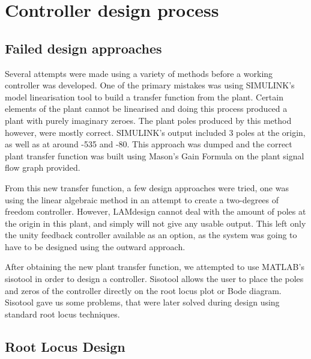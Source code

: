 \section{Controller design process}

\subsection{Failed design approaches}

Several attempts were made using a variety of methods before a working controller was developed. One of the primary mistakes was using SIMULINK's model linearisation tool to build a transfer function from the plant. Certain elements of the plant cannot be linearised and doing this process produced a plant with purely imaginary zeroes. The plant poles produced by this method however, were mostly correct. SIMULINK's output included 3 poles at the origin, as well as at around -535 and -80. This approach was dumped and the correct plant transfer function was built using Mason's Gain Formula on the plant signal flow graph provided.

From this new transfer function, a few design approaches were tried, one was using the linear algebraic method in an attempt to create a two-degrees of freedom controller. However, LAMdesign cannot deal with the amount of poles at the origin in this plant, and simply will not give any usable output. This left only the unity feedback controller available as an option, as the system was going to have to be designed using the outward approach.

After obtaining the new plant transfer function, we attempted to use MATLAB's sisotool in order to design a controller. Sisotool allows the user to place the poles and zeros of the controller directly on the root locus plot or Bode diagram. Sisotool gave us some problems, that were later solved during design using standard root locus techniques.


\subsection{Root Locus Design}

